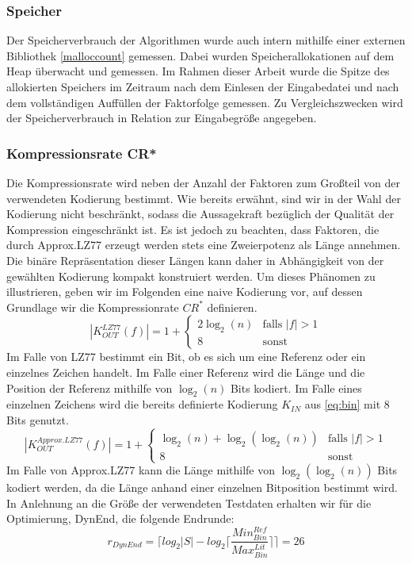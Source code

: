 \subsubsection{Speicher}
Der Speicherverbrauch der Algorithmen wurde auch intern mithilfe einer externen Bibliothek \ref{malloccount} gemessen. Dabei wurden Speicherallokationen auf dem Heap 
überwacht und gemessen. Im Rahmen dieser Arbeit wurde die Spitze des allokierten Speichers im Zeitraum nach dem Einlesen der Eingabedatei und nach dem vollständigen 
Auffüllen der Faktorfolge gemessen. Zu Vergleichszwecken wird der Speicherverbrauch in Relation zur Eingabegröße angegeben.

\subsubsection{Kompressionsrate CR*} \label{cr}
Die Kompressionsrate wird neben der Anzahl der Faktoren zum Großteil von der verwendeten Kodierung bestimmt. Wie bereits erwähnt, sind wir in der Wahl der Kodierung
nicht beschränkt, sodass die Aussagekraft bezüglich der Qualität der Kompression eingeschränkt ist. Es ist jedoch zu beachten, dass Faktoren, die durch Approx.LZ77
erzeugt werden stets eine Zweierpotenz als Länge annehmen. Die binäre Repräsentation dieser Längen kann daher in Abhängigkeit von der gewählten Kodierung kompakt 
konstruiert werden. Um dieses Phänomen zu illustrieren, geben wir im Folgenden eine naive Kodierung vor, auf dessen Grundlage wir die Kompressionrate $CR^*$ definieren.
\begin{equation}
    |K^{LZ77}_{OUT}(f)| = 1 + \begin{cases}
        2\log_2(n) & \text{falls } |f| > 1 \\
        8 & \text{sonst}
    \end{cases}
\end{equation}
Im Falle von LZ77 bestimmt ein Bit, ob es sich um eine Referenz oder ein einzelnes Zeichen handelt. Im Falle einer Referenz wird die Länge und die Position der Referenz
mithilfe von $\log_2(n)$ Bits kodiert. Im Falle eines einzelnen Zeichens wird die bereits definierte Kodierung $K_{IN}$ aus \ref{eq:bin} mit 8 Bits genutzt.
\begin{equation}
    |K^{Approx.LZ77}_{OUT}(f)|= 1 + \begin{cases}
        \log_2(n)+\log_2(\log_2(n)) & \text{falls } |f| > 1 \\
        8 & \text{sonst}
    \end{cases}
\end{equation}
Im Falle von Approx.LZ77 kann die Länge mithilfe von $\log_2(\log_2(n))$ Bits kodiert werden, da die Länge anhand einer einzelnen Bitposition bestimmt wird.
In Anlehnung an die Größe der verwendeten Testdaten erhalten wir für die Optimierung, DynEnd, die folgende Endrunde:
\begin{equation}
    r_{DynEnd} = \lceil log_2{|S|}-log_2{\lceil\frac{Min^{Ref}_{Bin}}{Max^{Lit}_{Bin}}\rceil} \rceil = 26
\end{equation}

